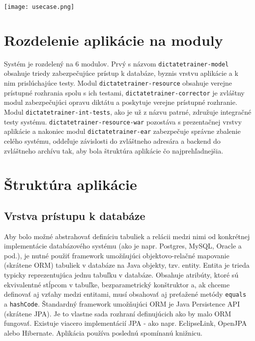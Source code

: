 \documentclass[12pt,oneside]{fithesis2}
\begin{document}
	\texttt{[image: usecase.png]}    
	
	\pagebreak
	   	\section{Rozdelenie aplikácie na moduly}
      	\par Systém je rozdelený na 6 modulov. Prvý s názvom \texttt{dictatetrainer-model} obsahuje triedy zabezpečujúce prístup k databáze, byznis vrstvu aplikácie a k nim prislúchajúce testy. Modul \texttt{dictatetrainer-resource} obsahuje verejne prístupné rozhrania spolu s ich testami, \texttt{dictatetrainer-corrector} je zvláštny modul zabezpečujúci opravu diktátu a poskytuje verejne prístupné rozhranie. Modul \texttt{dictatetrainer-int-tests}, ako je už z názvu patrné, združuje integračné testy systému. \texttt{dictatetrainer-resource-war} pozostáva s prezentačnej vrstvy aplikácie a nakoniec modul \texttt{dictatetrainer-ear} zabezpečuje správne zbalenie celého systému, oddeľuje závislosti do zvláštneho adresára a backend do zvláštneho archívu tak, aby bola štruktúra aplikácie čo najprehľadnejšia.
      	
    \section{Štruktúra aplikácie}
          \subsection{Vrstva prístupu k databáze}
      
      \par Aby bolo možné abstrahovať definíciu tabuliek a relácii medzi nimi od konkrétnej implementácie databázového systému (ako je napr. Postgres, MySQL, Oracle a pod.), je nutné použiť framework umožňujúci objektovo-relačné mapovanie (skrátene ORM) tabuliek v databáze na Java objekty, tzv. entity. Entita je trieda typicky reprezentujúca jednu tabuľku v databáze. Obsahuje atribúty, ktoré sú ekvivalentné stĺpcom v tabuľke, bezparametrický konštruktor a, ak chceme definovať aj vzťahy medzi entitami, musí obsahovať aj preťažené metódy \texttt{equals} a \texttt{hashCode}. Štandardný framework umožňujúci ORM je Java Persistence API (skrátene JPA). Je to vlastne sada rozhraní definujúcich ako by malo ORM fungovať. Existuje viacero implementácií JPA - ako napr. EclipseLink, OpenJPA alebo Hibernate. Aplikácia používa poslednú spomínanú knižnicu.
      
\end{document}
